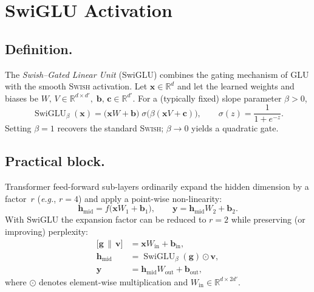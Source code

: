 \section{SwiGLU Activation}
\label{sec:swiglu}

\subsection{Definition.}
The \emph{Swish--Gated Linear Unit} (SwiGLU) \cite{shazeer2020gluvariantsimprovetransformer} combines the gating mechanism of GLU with the smooth \textsc{Swish} activation.  
Let $\mathbf{x}\!\in\!\mathbb{R}^{d}$ and let the learned weights and biases be
\(
W,\,V\!\in\!\mathbb{R}^{d\times d'},\;
\mathbf{b},\,\mathbf{c}\!\in\!\mathbb{R}^{d'}.
\)
For a (typically fixed) slope parameter $\beta>0$,
\begin{equation}
  \label{eq:swiglu}
  \operatorname{SwiGLU}_{\beta}(\mathbf{x})
  = \bigl(\mathbf{x}W+\mathbf{b}\bigr)\;\sigma\!\bigl(\beta(\mathbf{x}V+\mathbf{c})\bigr),
  \qquad
  \sigma(z)=\frac{1}{1+e^{-z}}.
\end{equation}
Setting $\beta=1$ recovers the standard \textsc{Swish}; $\beta\!\to\!0$ yields a
quadratic gate.

\subsection{Practical block.}
Transformer feed-forward sub-layers ordinarily expand the hidden dimension by a
factor~$r$ (\textit{e.g.}, $r=4$) and apply a point-wise non-linearity:
\[
  \mathbf{h}_\text{mid}=f\!\bigl(\mathbf{x}W_{1}+\mathbf{b}_{1}\bigr),
  \qquad
  \mathbf{y}= \mathbf{h}_\text{mid}W_{2}+\mathbf{b}_{2}.
\]
With SwiGLU the expansion factor can be reduced to $r=2$ while preserving (or
improving) perplexity:
\begin{align}
  \bigl[\mathbf{g}\,\|\,\mathbf{v}\bigr] &= \mathbf{x}W_{\text{in}}+\mathbf{b}_{\text{in}}, \\
  \mathbf{h}_\text{mid} &= \operatorname{SwiGLU}_{\beta}(\mathbf{g}) \odot \mathbf{v},\\
  \mathbf{y} &= \mathbf{h}_\text{mid} W_{\text{out}} + \mathbf{b}_{\text{out}},
\end{align}
where $\odot$ denotes element-wise multiplication and
$W_{\text{in}}\!\in\!\mathbb{R}^{d\times 2d'}$.

